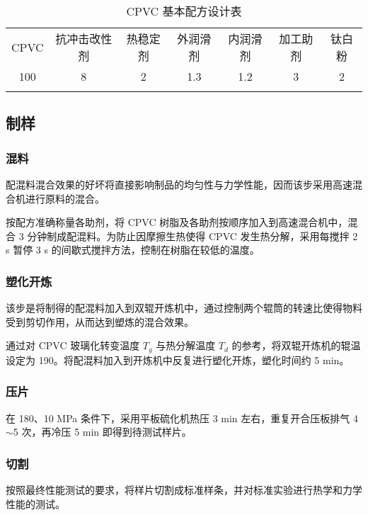 \begin{table}[!htb]
    \caption{CPVC 基本配方设计表}
    \label{tabCPVCFormula}
    \begin{center}
    \footnotesize{
        \begin{tabular}{ccccccc}
            \Xhline{1pt}
            CPVC & 抗冲击改性剂 & 热稳定剂 & 外润滑剂 & 内润滑剂 & 加工助剂 & 钛白粉 \\
            \Xhline{0.5pt}
            100\footnotemark[1] & 8 & 2 & 1.3 & 1.2 & 3 & 2   \\
            \Xhline{1pt}
        \end{tabular}
    }
    \end{center}
\end{table}

\subsection{制样}

\subsubsection{混料}
配混料混合效果的好坏将直接影响制品的均匀性与力学性能，因而该步采用高速混合机进行原料的混合。\par
按配方准确称量各助剂，将 CPVC 树脂及各助剂按顺序加入到高速混合机中，混合 3 分钟制成配混料。为防止因摩擦生热使得 CPVC 发生热分解，采用每搅拌 2 s 暂停 3 s 的间歇式搅拌方法，控制在树脂在较低的温度。

\subsubsection{塑化开炼}
该步是将制得的配混料加入到双辊开炼机中，通过控制两个辊筒的转速比使得物料受到剪切作用，从而达到塑炼的混合效果。\par
通过对 CPVC 玻璃化转变温度 $T_g$ 与热分解温度 $T_d$ 的参考，将双辊开炼机的辊温设定为 190\cd。将配混料加入到开炼机中反复进行塑化开炼，塑化时间约 5 min。

\subsubsection{压片}
在 180\cd、10 MPa 条件下，采用平板硫化机热压 3 min 左右，重复开合压板排气 4$\sim$5 次，再冷压 5 min 即得到待测试样片。

\subsubsection{切割}
按照最终性能测试的要求，将样片切割成标准样条，并对标准实验进行热学和力学性能的测试。


